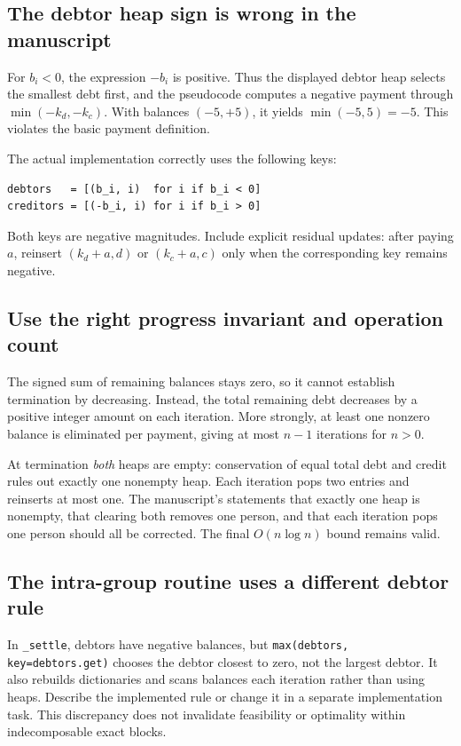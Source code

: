 \documentclass[11pt]{article}
\begin{document}
\subsection{The debtor heap sign is wrong in the manuscript}

For $b_i<0$, the expression $-b_i$ is positive. Thus the displayed debtor
heap selects the smallest debt first, and the pseudocode computes a
negative payment through $\min(-k_d,-k_c)$. With balances $(-5,+5)$,
it yields $\min(-5,5)=-5$. This violates the basic payment definition.

The actual implementation correctly uses the following keys:
\begin{verbatim}
debtors   = [(b_i, i)  for i if b_i < 0]
creditors = [(-b_i, i) for i if b_i > 0]
\end{verbatim}
Both keys are negative magnitudes. Include explicit residual updates:
after paying $a$, reinsert $(k_d+a,d)$ or $(k_c+a,c)$ only when the
corresponding key remains negative.

\subsection{Use the right progress invariant and operation count}

The signed sum of remaining balances stays zero, so it cannot establish
termination by decreasing. Instead, the total remaining debt decreases
by a positive integer amount on each iteration. More strongly, at least
one nonzero balance is eliminated per payment, giving at most $n-1$
iterations for $n>0$.

At termination \emph{both} heaps are empty: conservation of equal total
debt and credit rules out exactly one nonempty heap. Each iteration pops
two entries and reinserts at most one. The manuscript's statements that
exactly one heap is nonempty, that clearing both removes one person, and
that each iteration pops one person should all be corrected. The final
$O(n\log n)$ bound remains valid.

\subsection{The intra-group routine uses a different debtor rule}

In \texttt{\_settle}, debtors have negative balances, but
\texttt{max(debtors, key=debtors.get)} chooses the debtor closest to zero,
not the largest debtor. It also rebuilds dictionaries and scans balances
each iteration rather than using heaps. Describe the implemented rule or
change it in a separate implementation task. This discrepancy does not
invalidate feasibility or optimality within indecomposable exact blocks.
\end{document}
